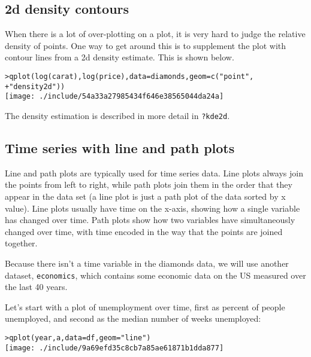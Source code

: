\subsection{2d density contours}

When there is a lot of over-plotting on a plot, it is very hard to judge the relative density of points.  One way to get around this is to supplement the plot with contour lines from a 2d density estimate.  This is shown below.

\begin{alltt}
> qplot(log(carat), log(price), data = diamonds, geom = c("point", 
+     "density2d"))
\texttt{[image: ./include/54a33a27985434f646e38565044da24a]}

\end{alltt}

The density estimation is described in more detail in {\tt ?kde2d}.

\subsection{Time series with line and path plots}\label{sub:line_plot}

Line and path plots are typically used for time series data.  Line plots always join the points from left to right, while path plots join them in the order that they appear in the data set (a line plot is just a path plot of the data sorted by x value).  Line plots usually have time on the x-axis, showing how a single variable has changed over time.  Path plots show how two variables have simultaneously changed over time, with time encoded in the way that the points are joined together.

Because there isn't a time variable in the diamonds data, we will use another dataset, {\tt economics}, which contains some economic data on the US measured over the last 40 years.

Let's start with a plot of unemployment over time, first as percent of people unemployed, and second as the median number of weeks unemployed:

\begin{alltt}
> qplot(year, a, data = df, geom = "line")
\texttt{[image: ./include/9a69efd35c8cb7a85ae61871b1dda877]}

\end{alltt}


